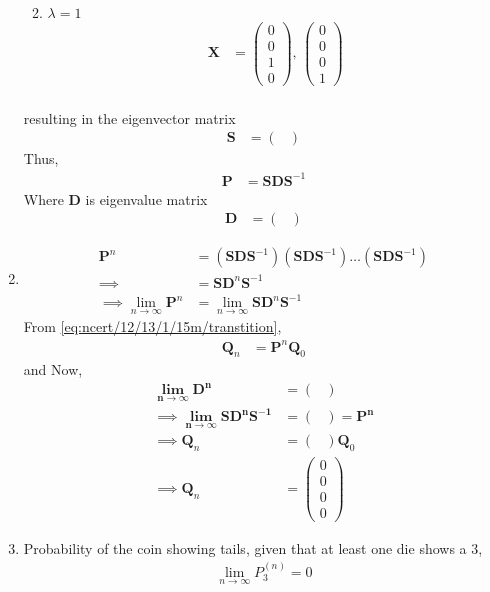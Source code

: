 \documentclass[journal,12pt,two column]{IEEEtran}
\providecommand{\prt}[2]{\ensuremath{P_{#1}^{\left(#2\right)} }}        %
\theoremstyle{remark}
\newcommand{\myvec}[1]{\ensuremath{\begin{pmatrix}#1\end{pmatrix}}}
\let\vec\mathbf
\begin{document}
\begin{enumerate}
\begin{enumerate}
\begin{align}
\end{align}
\item $\lambda = 1$
\begin{align}
\vec{X} &= \myvec{0 \\ 0 \\ 1 \\ 0},\, 
\myvec{0 \\ 0 \\ 0 \\ 1}\\
\end{align}
\end{enumerate}
resulting in the 
eigenvector matrix
\begin{align}
\vec{S} &= \myvec{}
\end{align}
Thus, 
\begin{align}
	\vec{P} &= \vec{S}\vec{D}\vec{S}^{-1}
\end{align}
Where $\vec{D}$ is eigenvalue matrix
\begin{align}
\vec{D} &= \myvec{}
\end{align}
\item
\begin{align}
\vec{P}^{n} &= (\vec{S}\vec{D}\vec{S}^{-1})(\vec{S}\vec{D}\vec{S}^{-1}) \dots (\vec{S}\vec{D}\vec{S}^{-1})\\
\implies  &= \vec{S}\vec{D}^{n}\vec{S}^{-1}\\
\implies \lim_{n \to \infty}\vec{P}^{n} &= \lim_{n \to \infty}\vec{S}\vec{D}^{n}\vec{S}^{-1}
\end{align}
	From 
        \eqref{eq:ncert/12/13/1/15m/transtition},
\begin{align}
\vec{Q}_{n} &= \vec{P}^{n}\vec{Q}_{0}
\end{align}
and
Now,
\begin{align}
\vec{\lim_{n \to \infty}\vec{D}^{n}} &= \myvec{}\\ 
\implies \vec{\lim_{n \to \infty}\vec{S}\vec{D}^{n}\vec{S}^{-1}} &= \myvec{} = \vec{\vec{P}^{n}}\\
\implies \vec{Q}_n &= \myvec{}\vec{Q}_0\\
\implies \vec{Q}_n &= \myvec{0 \\ 0 \\ 0 \\ 0} 
\end{align}
\item 
    Probability of the coin showing tails, given that at least one die shows a 3,
    \begin{align}
       \lim_{n \to \infty} \prt{3}{n} = 0
    \end{align}
   \end{enumerate} 
\end{document}

